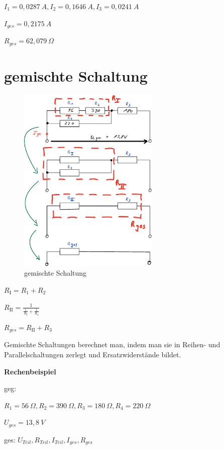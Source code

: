 $I_1 = 0,0287~A, I_2 = 0,1646~A, I_3 = 0,0241~A$

$I_{ges} = 0,2175~A$

$R_{ges} = 62,079~\Omega$

\newpage

\section{gemischte Schaltung}\label{gemischte-schaltung}

\begin{figure}[!ht]%
\centering
\includegraphics[width=0.6\textwidth]{images/Skizze/25_gemischte_Schaltung.pdf}
\caption{gemischte Schaltung}
\end{figure}

$R_\mathrm{I} = R_1 + R_2$

$R_\mathrm{II} = \frac{1}{\frac{1}{R_\mathrm{I}} + \frac{1}{R_4}}$

$R_{ges} = R_\mathrm{II} + R_3$

Gemischte Schaltungen berechnet man, indem man sie in Reihen- und
Parallelschaltungen zerlegt und Ersatzwiderstände bildet.

\textbf{Rechenbeispiel}

geg:

$R_1 = 56~\Omega, R_2 = 390~\Omega, R_3 = 180~\Omega, R_4 = 220~\Omega$

$U_{ges} = 13,8~V$

ges: $U_{Teil}, R_{Teil}, I_{Teil}, I_{{ges}}, R_{ges}$


